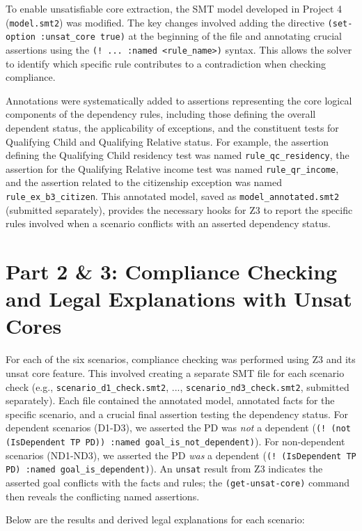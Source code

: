\documentclass[11pt, letterpaper]{article}
\begin{document}
To enable unsatisfiable core extraction, the SMT model developed in Project 4 (\texttt{model.smt2}) was modified. The key changes involved adding the directive \texttt{(set-option :unsat\_core true)} at the beginning of the file and annotating crucial assertions using the \texttt{(! ... :named <rule\_name>)} syntax. This allows the solver to identify which specific rule contributes to a contradiction when checking compliance.

Annotations were systematically added to assertions representing the core logical components of the dependency rules, including those defining the overall dependent status, the applicability of exceptions, and the constituent tests for Qualifying Child and Qualifying Relative status. For example, the assertion defining the Qualifying Child residency test was named \texttt{rule\_qc\_residency}, the assertion for the Qualifying Relative income test was named \texttt{rule\_qr\_income}, and the assertion related to the citizenship exception was named \texttt{rule\_ex\_b3\_citizen}. This annotated model, saved as \texttt{model\_annotated.smt2} (submitted separately), provides the necessary hooks for Z3 to report the specific rules involved when a scenario conflicts with an asserted dependency status.

\section{Part 2 \& 3: Compliance Checking and Legal Explanations with Unsat Cores}

For each of the six scenarios, compliance checking was performed using Z3 and its unsat core feature. This involved creating a separate SMT file for each scenario check (e.g., \texttt{scenario\_d1\_check.smt2}, ..., \texttt{scenario\_nd3\_check.smt2}, submitted separately). Each file contained the annotated model, annotated facts for the specific scenario, and a crucial final assertion testing the dependency status. For dependent scenarios (D1-D3), we asserted the PD was \textit{not} a dependent (\texttt{(! (not (IsDependent TP PD)) :named goal\_is\_not\_dependent)}). For non-dependent scenarios (ND1-ND3), we asserted the PD \textit{was} a dependent (\texttt{(! (IsDependent TP PD) :named goal\_is\_dependent)}). An \texttt{unsat} result from Z3 indicates the asserted goal conflicts with the facts and rules; the \texttt{(get-unsat-core)} command then reveals the conflicting named assertions.

Below are the results and derived legal explanations for each scenario:
\end{document}
